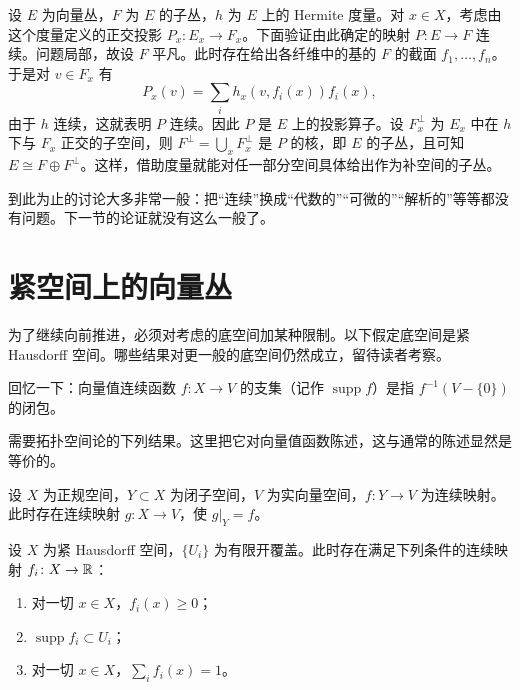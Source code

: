设 $E$ 为向量丛，$F$ 为 $E$ 的子丛，$h$ 为 $E$ 上的 Hermite 度量。对 $x\in X$，考虑由这个度量定义的正交投影 $P_x\colon E_x\to F_x$。下面验证由此确定的映射 $P\colon E\to F$ 连续。问题局部，故设 $F$ 平凡。此时存在给出各纤维中的基的 $F$ 的截面 $f_1,\dots,f_n$。于是对 $v\in F_x$ 有
\[
P_x(v)=\sum_i h_x(v,f_i(x))f_i(x),
\]
由于 $h$ 连续，这就表明 $P$ 连续。因此 $P$ 是 $E$ 上的投影算子。设 $F_x^{\perp}$ 为 $E_x$ 中在 $h$ 下与 $F_x$ 正交的子空间，则 $F^{\perp}=\bigcup_x F_x^{\perp}$ 是 $P$ 的核，即 $E$ 的子丛，且可知 $E\cong F\oplus F^{\perp}$。这样，借助度量就能对任一部分空间具体给出作为补空间的子丛。


\begin{remark}{}
  到此为止的讨论大多非常一般：把“连续”换成“代数的”“可微的”“解析的”等等都没有问题。下一节的论证就没有这么一般了。
\end{remark}

\section{紧空间上的向量丛}

为了继续向前推进，必须对考虑的底空间加某种限制。以下假定底空间是紧 Hausdorff 空间。哪些结果对更一般的底空间仍然成立，留待读者考察。

回忆一下：向量值连续函数 $f\colon X\to V$ 的支集（记作 $\operatorname{supp}f$）是指 $f^{-1}(V-\{0\})$ 的闭包。

需要拓扑空间论的下列结果。这里把它对向量值函数陈述，这与通常的陈述显然是等价的。

设 $X$ 为正规空间，$Y\subset X$ 为闭子空间，$V$ 为实向量空间，$f\colon Y\to V$ 为连续映射。此时存在连续映射 $g\colon X\to V$，使 $g|_Y=f$。

设 $X$ 为紧 Hausdorff 空间，$\{U_i\}$ 为有限开覆盖。此时存在满足下列条件的连续映射 $f_i\colon X\to\mathbb{R}$：

\begin{enumerate}[label=(\roman*),leftmargin=2.4em,itemsep=1pt]
\item 对一切 $x\in X$，$f_i(x)\ge0$；
\item $\operatorname{supp}f_i\subset U_i$；
\item 对一切 $x\in X$，$\sum_i f_i(x)=1$。
\end{enumerate}

